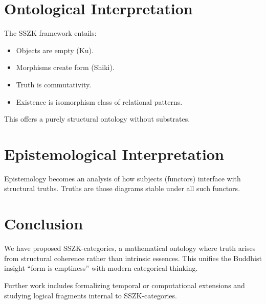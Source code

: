 \documentclass[11pt]{article}
\begin{document}
\section{Ontological Interpretation}
The SSZK framework entails:
\begin{itemize}
    \item Objects are empty (Ku).
    \item Morphisms create form (Shiki).
    \item Truth is commutativity.
    \item Existence is isomorphism class of relational patterns.
\end{itemize}

This offers a purely structural ontology without substrates.

\section{Epistemological Interpretation}
Epistemology becomes an analysis of how subjects (functors) interface with structural truths. Truths are those diagrams stable under all such functors.

\section{Conclusion}
We have proposed SSZK-categories, a mathematical ontology where truth arises from structural coherence rather than intrinsic essences. This unifies the Buddhist insight ``form is emptiness'' with modern categorical thinking.

Further work includes formalizing temporal or computational extensions and studying logical fragments internal to SSZK-categories.
\end{document}
